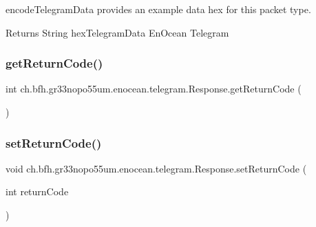 encode\+Telegram\+Data provides an example data hex for this packet type.

\begin{DoxyReturn}{Returns}
String hex\+Telegram\+Data En\+Ocean Telegram 
\end{DoxyReturn}
\hypertarget{classch_1_1bfh_1_1gr33nopo55um_1_1enocean_1_1telegram_1_1_response_a3d0ad42e8295de5a7d862f9dc798f853}{}\label{classch_1_1bfh_1_1gr33nopo55um_1_1enocean_1_1telegram_1_1_response_a3d0ad42e8295de5a7d862f9dc798f853} 
\subsubsection{\texorpdfstring{get\+Return\+Code()}{getReturnCode()}}
{\footnotesize\ttfamily int ch.\+bfh.\+gr33nopo55um.\+enocean.\+telegram.\+Response.\+get\+Return\+Code (\begin{DoxyParamCaption}{ }\end{DoxyParamCaption})}

\hypertarget{classch_1_1bfh_1_1gr33nopo55um_1_1enocean_1_1telegram_1_1_response_af89c0749d63b470e612d74596a210486}{}\label{classch_1_1bfh_1_1gr33nopo55um_1_1enocean_1_1telegram_1_1_response_af89c0749d63b470e612d74596a210486} 
\subsubsection{\texorpdfstring{set\+Return\+Code()}{setReturnCode()}}
{\footnotesize\ttfamily void ch.\+bfh.\+gr33nopo55um.\+enocean.\+telegram.\+Response.\+set\+Return\+Code (\begin{DoxyParamCaption}\item[{int}]{return\+Code }\end{DoxyParamCaption})}

\hypertarget{classch_1_1bfh_1_1gr33nopo55um_1_1enocean_1_1telegram_1_1_response_a7e5e88df8312bf7a07f665670ff2fad1}{}\label{classch_1_1bfh_1_1gr33nopo55um_1_1enocean_1_1telegram_1_1_response_a7e5e88df8312bf7a07f665670ff2fad1} 
